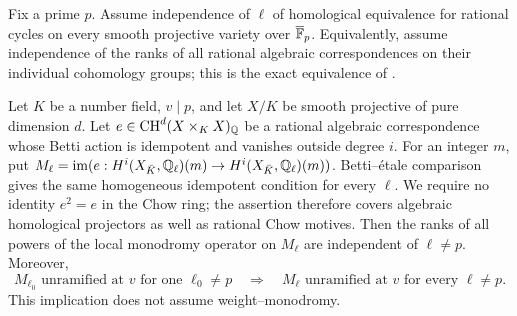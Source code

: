 \begin{proposition}
\label{c:chow-unramified-rank-reduction}
Fix a prime $p$. Assume independence of $\ell$ of homological
equivalence for rational cycles on every smooth projective variety
over $\overline{\mathbb F}_p$. Equivalently, assume independence of the
ranks of all rational algebraic correspondences on their individual
cohomology groups; this is the exact equivalence of
\citet[Theorem~1, Definition~4.1 and Theorem~4.6]{c_vandobben2020}.

Let $K$ be a number field, $v\mid p$, and let $X/K$ be smooth
projective of pure dimension $d$. Let
$e\in\operatorname{CH}^d(X\times_KX)_\mathbb Q$ be a rational algebraic correspondence
whose Betti action is idempotent and vanishes outside degree $i$.
For an integer $m$, put
$M_\ell=\operatorname{im}(e:H^i(X_{\bar K},\mathbb Q_\ell)(m)
\to H^i(X_{\bar K},\mathbb Q_\ell)(m))$.
Betti--\'etale comparison gives the same homogeneous idempotent
condition for every $\ell$. We require no identity $e^2=e$ in
the Chow ring; the assertion therefore covers algebraic
homological projectors as well as rational Chow motives.
Then the ranks of all powers of the local monodromy operator on
$M_\ell$ are independent of $\ell\ne p$.
Moreover,
\[
 M_{\ell_0}\text{ unramified at }v\text{ for one }\ell_0\ne p
 \quad\Longrightarrow\quad
 M_\ell\text{ unramified at }v\text{ for every }\ell\ne p.
\]
This implication does not assume weight--monodromy.
\end{proposition}

